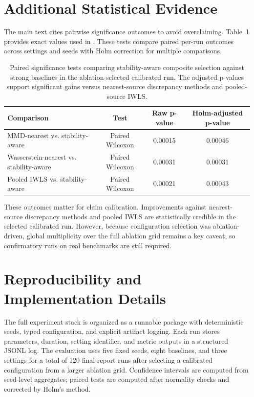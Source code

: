 \documentclass{article} %
\begin{document}



\appendix
\section{Additional Statistical Evidence}
The main text cites pairwise significance outcomes to avoid overclaiming. Table~\ref{tab:significance} provides exact values used in . These tests compare paired per-run outcomes across settings and seeds with Holm correction for multiple comparisons.

\begin{table}[h]
\caption{Paired significance tests comparing stability-aware composite selection against strong baselines in the ablation-selected calibrated run. The adjusted p-values support significant gains versus nearest-source discrepancy methods and pooled-source IWLS.}
\label{tab:significance}
\centering
\small
\renewcommand{\arraystretch}{1.1}
\setlength{\tabcolsep}{4pt}
\begin{tabular}{lccc}
\hline
Comparison & Test & Raw p-value & Holm-adjusted p-value \\
\hline
MMD-nearest vs. stability-aware & Paired Wilcoxon & 0.00015 & 0.00046 \\
Wasserstein-nearest vs. stability-aware & Paired Wilcoxon & 0.00031 & 0.00031 \\
Pooled IWLS vs. stability-aware & Paired Wilcoxon & 0.00021 & 0.00043 \\
\hline
\end{tabular}
\end{table}

These outcomes matter for claim calibration. Improvements against nearest-source discrepancy methods and pooled IWLS are statistically credible in the selected calibrated run. However, because configuration selection was ablation-driven, global multiplicity over the full ablation grid remains a key caveat, so confirmatory runs on real benchmarks are still required.

\section{Reproducibility and Implementation Details}
The full experiment stack is organized as a runnable package with deterministic seeds, typed configuration, and explicit artifact logging. Each run stores parameters, duration, setting identifier, and metric outputs in a structured JSONL log. The evaluation uses five fixed seeds, eight baselines, and three settings for a total of 120 final-report runs after selecting a calibrated configuration from a larger ablation grid. Confidence intervals are computed from seed-level aggregates; paired tests are computed after normality checks and corrected by Holm's method.
\end{document}
